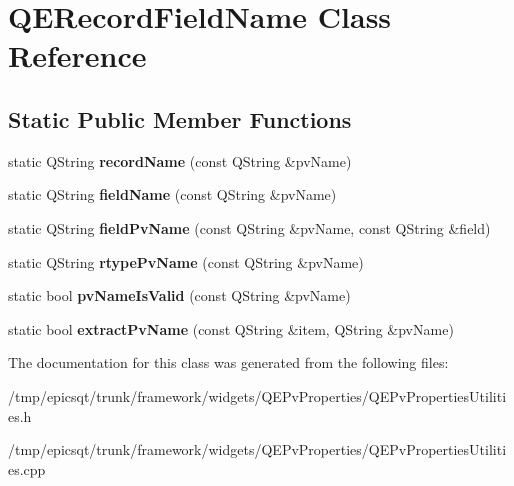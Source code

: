 \hypertarget{classQERecordFieldName}{
\section{QERecordFieldName Class Reference}
\label{classQERecordFieldName}
}
\subsection*{Static Public Member Functions}
\begin{DoxyCompactItemize}
\item 
\hypertarget{classQERecordFieldName_a78f2d50961a473c6f0512db791d50d1d}{
static QString {\bfseries recordName} (const QString \&pvName)}
\label{classQERecordFieldName_a78f2d50961a473c6f0512db791d50d1d}

\item 
\hypertarget{classQERecordFieldName_ad9cf49c2225d41d313b44fa670838e2f}{
static QString {\bfseries fieldName} (const QString \&pvName)}
\label{classQERecordFieldName_ad9cf49c2225d41d313b44fa670838e2f}

\item 
\hypertarget{classQERecordFieldName_ab0d666ae92c1da0ce374ab7f15c08e46}{
static QString {\bfseries fieldPvName} (const QString \&pvName, const QString \&field)}
\label{classQERecordFieldName_ab0d666ae92c1da0ce374ab7f15c08e46}

\item 
\hypertarget{classQERecordFieldName_a340efe8005d6294ebda2827023fd38cb}{
static QString {\bfseries rtypePvName} (const QString \&pvName)}
\label{classQERecordFieldName_a340efe8005d6294ebda2827023fd38cb}

\item 
\hypertarget{classQERecordFieldName_a77e68321071b0ac1fd7edf8dc9f5c437}{
static bool {\bfseries pvNameIsValid} (const QString \&pvName)}
\label{classQERecordFieldName_a77e68321071b0ac1fd7edf8dc9f5c437}

\item 
\hypertarget{classQERecordFieldName_a46a028963686883f8b0c361c7c24992a}{
static bool {\bfseries extractPvName} (const QString \&item, QString \&pvName)}
\label{classQERecordFieldName_a46a028963686883f8b0c361c7c24992a}

\end{DoxyCompactItemize}


The documentation for this class was generated from the following files:\begin{DoxyCompactItemize}
\item 
/tmp/epicsqt/trunk/framework/widgets/QEPvProperties/QEPvPropertiesUtilities.h\item 
/tmp/epicsqt/trunk/framework/widgets/QEPvProperties/QEPvPropertiesUtilities.cpp\end{DoxyCompactItemize}
